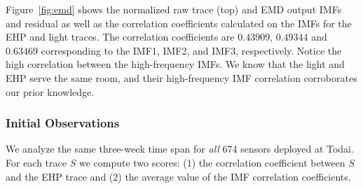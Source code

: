 Figure~\ref{fig:emd} shows the normalized raw trace (top) and EMD output IMFs and residual as well as the 
correlation coefficients calculated on the IMFs for the EHP and
light traces.  The correlation coefficients are $0.43909$, $0.49344$ and $0.63469$ corresponding to the IMF1, 
IMF2, and IMF3, respectively.  Notice the high correlation between the high-frequency IMFs.
We know that the light and EHP serve the same room, and their high-frequency IMF correlation corroborates
our prior knowledge.







\subsubsection{Initial Observations}
We analyze the same three-week time span for \emph{all} 674 sensors deployed at Todai.
For each trace $S$ we compute two scores: (1) the correlation coefficient between $S$ and the EHP trace
and (2) the average value of the IMF correlation coefficients.

